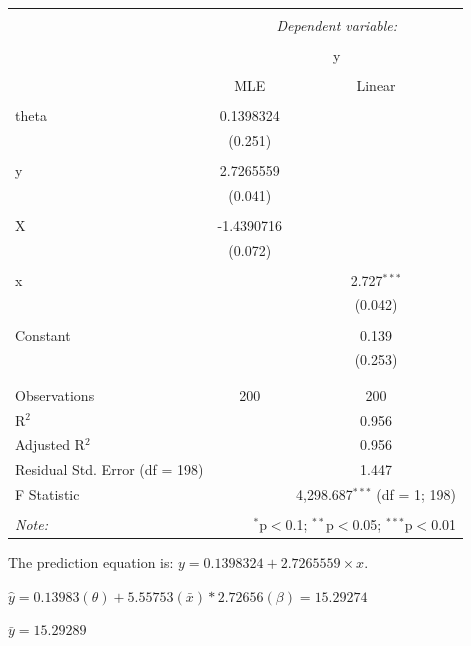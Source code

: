 \documentclass[12pt,letterpaper]{article}
\begin{document}
\begin{table}[!htbp] \centering
  \caption{}
  \label{tab:mle}
\begin{tabular}{@{\extracolsep{5pt}}lcc}
\\[-1.8ex]\hline
\hline \\[-1.8ex]
 & \multicolumn{2}{c}{\textit{Dependent variable:}} \\
\cline{2-3}
\\[-1.8ex] & \multicolumn{2}{c}{y} \\
\\[-1.8ex] & MLE & Linear\\
\hline \\[-1.8ex]
 theta & 0.1398324 &  \\
  & (0.251) &  \\
  & & \\
 y & 2.7265559 &  \\
  & (0.041) &  \\
  & & \\
 X & -1.4390716 &  \\
  & (0.072) &  \\
  & & \\
 x &  & 2.727$^{***}$ \\
  &  & (0.042) \\
  & & \\
 Constant &  & 0.139 \\
  &  & (0.253) \\
  & & \\
\hline \\[-1.8ex]
Observations & 200 & 200 \\
R$^{2}$ &  & 0.956 \\
Adjusted R$^{2}$ &  & 0.956 \\
Residual Std. Error (df = 198) &  & 1.447 \\
F Statistic &  & 4,298.687$^{***}$ (df = 1; 198) \\
\hline
\hline \\[-1.8ex]
\textit{Note:}  & \multicolumn{2}{r}{$^{*}$p$<$0.1; $^{**}$p$<$0.05; $^{***}$p$<$0.01} \\
\end{tabular}
\end{table}


	The prediction equation is: $y = 0.1398324 + 2.7265559 \times x$.

	$\hat y =  0.13983  (\theta)  +  5.55753  (\bar{x}) *  2.72656  (\beta) =  15.29274$

	$\bar y = 15.29289$
\end{document}
